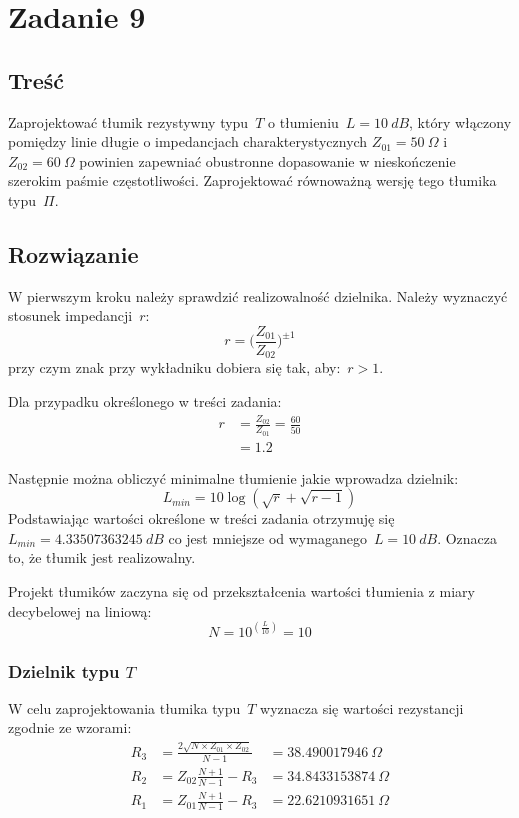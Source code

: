 \documentclass[rep.tex]{subfiles}
\begin{document}
\chapter{Zadanie 9}
\label{zad9}
\section{Treść}
Zaprojektować tłumik rezystywny typu~$T$ o tłumieniu~$L = 10~dB$,
który włączony pomiędzy linie długie o impedancjach charakterystycznych $Z_{01} = 50~\Omega$ i $Z_{02} = 60~\Omega$
powinien zapewniać obustronne dopasowanie w nieskończenie szerokim paśmie częstotliwości.
Zaprojektować równoważną wersję tego tłumika typu~$\Pi$.

\section{Rozwiązanie}
W pierwszym kroku należy sprawdzić realizowalność dzielnika.
Należy wyznaczyć stosunek impedancji~$r$:
\begin{equation}
  r = \Big(\frac{Z_{01}}{Z_{02}}\Big)^{\pm1}
\end{equation}
przy czym znak przy wykładniku dobiera się tak, aby:~$r > 1$.

Dla przypadku określonego w treści zadania:
\begin{align}
  r &= \frac{Z_{02}}{Z_{01}} = \frac{60}{50} \nonumber \\
  &= 1.2 \nonumber
\end{align}

Następnie można obliczyć minimalne tłumienie jakie wprowadza dzielnik:
\begin{equation}
  L_{min} = 10 \log(\sqrt{r} + \sqrt{r - 1})
\end{equation}
Podstawiając wartości określone w treści zadania otrzymuję się~$L_{min} = 4.33507363245~dB$ co jest mniejsze od wymaganego~$L = 10~dB$.
Oznacza to, że tłumik jest realizowalny.

Projekt tłumików zaczyna się od przekształcenia wartości tłumienia z miary decybelowej na liniową:
\begin{equation}
  N = 10^{(\frac{L}{10})} = 10
\end{equation}

\subsection{Dzielnik typu $T$}
W celu zaprojektowania tłumika typu~$T$ wyznacza się wartości rezystancji zgodnie ze wzorami:
\begin{align}
  R_3 &= \frac{2\sqrt{N \times Z_{01} \times Z_{02}}}{N - 1} &= 38.490017946~\Omega \\
  R_2 &= Z_{02} \frac{N + 1}{N - 1} - R_3 &= 34.8433153874~\Omega \\
  R_1 &= Z_{01} \frac{N + 1}{N - 1} - R_3 &= 22.6210931651~\Omega
\end{align}
\end{document}
